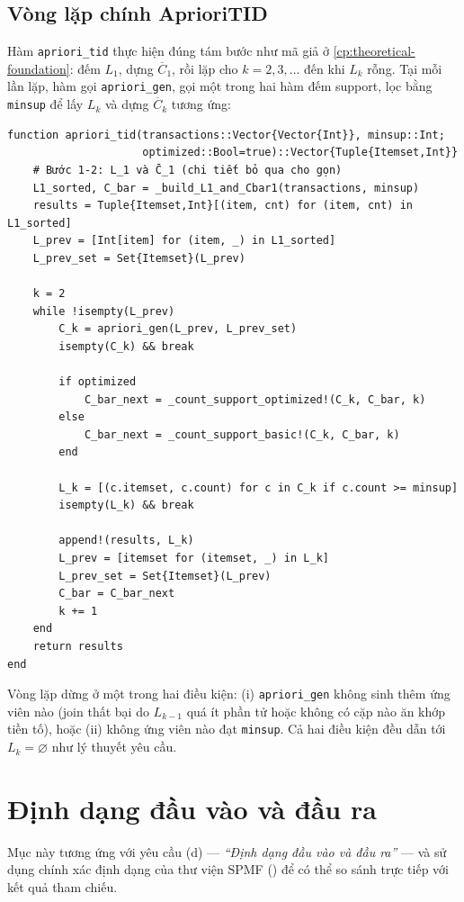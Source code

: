 \subsection{Vòng lặp chính AprioriTID}

Hàm \texttt{apriori\_tid} thực hiện đúng tám bước như mã giả ở \autoref{cp:theoretical-foundation}: đếm $L_1$, dựng $\overline{C}_1$, rồi lặp cho $k=2,3,\ldots$ đến khi $L_k$ rỗng. Tại mỗi lần lặp, hàm gọi \texttt{apriori\_gen}, gọi một trong hai hàm đếm support, lọc bằng \texttt{minsup} để lấy $L_k$ và dựng $\overline{C}_k$ tương ứng:

\begin{verbatim}
function apriori_tid(transactions::Vector{Vector{Int}}, minsup::Int;
                     optimized::Bool=true)::Vector{Tuple{Itemset,Int}}
    # Bước 1-2: L_1 và C̄_1 (chi tiết bỏ qua cho gọn)
    L1_sorted, C_bar = _build_L1_and_Cbar1(transactions, minsup)
    results = Tuple{Itemset,Int}[(item, cnt) for (item, cnt) in L1_sorted]
    L_prev = [Int[item] for (item, _) in L1_sorted]
    L_prev_set = Set{Itemset}(L_prev)

    k = 2
    while !isempty(L_prev)
        C_k = apriori_gen(L_prev, L_prev_set)
        isempty(C_k) && break

        if optimized
            C_bar_next = _count_support_optimized!(C_k, C_bar, k)
        else
            C_bar_next = _count_support_basic!(C_k, C_bar, k)
        end

        L_k = [(c.itemset, c.count) for c in C_k if c.count >= minsup]
        isempty(L_k) && break

        append!(results, L_k)
        L_prev = [itemset for (itemset, _) in L_k]
        L_prev_set = Set{Itemset}(L_prev)
        C_bar = C_bar_next
        k += 1
    end
    return results
end
\end{verbatim}

Vòng lặp dừng ở một trong hai điều kiện: (i) \texttt{apriori\_gen} không sinh thêm ứng viên nào (join thất bại do $L_{k-1}$ quá ít phần tử hoặc không có cặp nào ăn khớp tiền tố), hoặc (ii) không ứng viên nào đạt \texttt{minsup}. Cả hai điều kiện đều dẫn tới $L_k = \varnothing$ như lý thuyết yêu cầu.

\section{Định dạng đầu vào và đầu ra}
\label{sec:impl-io}

Mục này tương ứng với yêu cầu (d) --- \emph{``Định dạng đầu vào và đầu ra''} --- và sử dụng chính xác định dạng của thư viện SPMF (\cite{FournierViger2014SPMF}) để có thể so sánh trực tiếp với kết quả tham chiếu.

